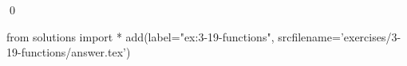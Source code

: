 
\begin{ex}
  \label{ex:3-19-functions}
  
  \qed
\end{ex}
\begin{python0}
from solutions import *
add(label="ex:3-19-functions",
    srcfilename='exercises/3-19-functions/answer.tex')
\end{python0}
